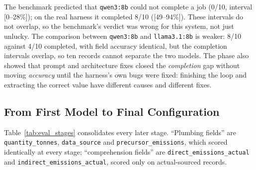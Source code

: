 The benchmark predicted that \texttt{qwen3:8b} could not complete a job
(0/10, interval [0--28\%]); on the real harness it completed 8/10
([49--94\%]). These intervals do not overlap, so the benchmark's verdict
was wrong for this system, not just unlucky. The comparison between
\texttt{qwen3:8b} and \texttt{llama3.1:8b} is weaker: 8/10 against 4/10
completed, with field accuracy identical, but the completion intervals
overlap, so ten records cannot separate the two models. The phase also
showed that prompt and architecture fixes closed the \textit{completion}
gap without moving \textit{accuracy} until the harness's own bugs were
fixed: finishing the loop and extracting the correct value have different
causes and different fixes.

\subsection*{From First Model to Final Configuration}

Table~\ref{tab:eval_stages} consolidates every later stage. ``Plumbing
fields'' are \texttt{quantity\_tonnes}, \texttt{data\_source} and
\texttt{precursor\_emissions}, which scored identically at every stage;
``comprehension fields'' are \texttt{direct\_emissions\_actual} and
\texttt{indirect\_emissions\_actual}, scored only on actual-sourced records.

